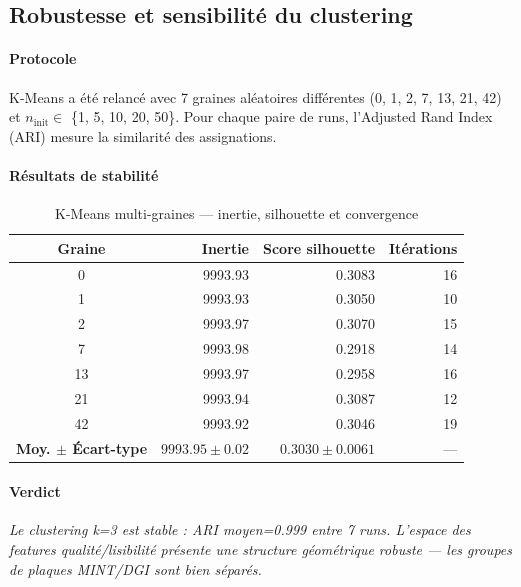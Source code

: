 \subsection{Robustesse et sensibilité du clustering}

\paragraph{Protocole}
K-Means a été relancé avec 7 graines aléatoires différentes
(0, 1, 2, 7, 13, 21, 42) et $n_{\text{init}} \in$
\{1, 5, 10, 20, 50\}.
Pour chaque paire de runs, l'Adjusted Rand Index (ARI) mesure la similarité des
assignations.

\paragraph{Résultats de stabilité}

\begin{table}[H]
    \centering
    \caption{K-Means multi-graines — inertie, silhouette et convergence}
    \label{tab:robustness_seeds}
    \small
    \begin{tabular}{c|r|r|r}
        \hline
        \textbf{Graine} & \textbf{Inertie} & \textbf{Score silhouette} & \textbf{Itérations} \\
        \hline
        0 & 9993.93 & 0.3083 & 16 \\
        1 & 9993.93 & 0.3050 & 10 \\
        2 & 9993.97 & 0.3070 & 15 \\
        7 & 9993.98 & 0.2918 & 14 \\
        13 & 9993.97 & 0.2958 & 16 \\
        21 & 9993.94 & 0.3087 & 12 \\
        42 & 9993.92 & 0.3046 & 19 \\
        \hline
        \textbf{Moy. $\pm$ Écart-type} & $9993.95 \pm 0.02$ & $0.3030 \pm 0.0061$ & — \\
        \hline
    \end{tabular}
\end{table}

\paragraph{Verdict}
\textit{Le clustering k=3 est stable : ARI moyen=0.999 entre 7 runs. L'espace des features qualité/lisibilité présente une structure géométrique robuste — les groupes de plaques MINT/DGI sont bien séparés.}

